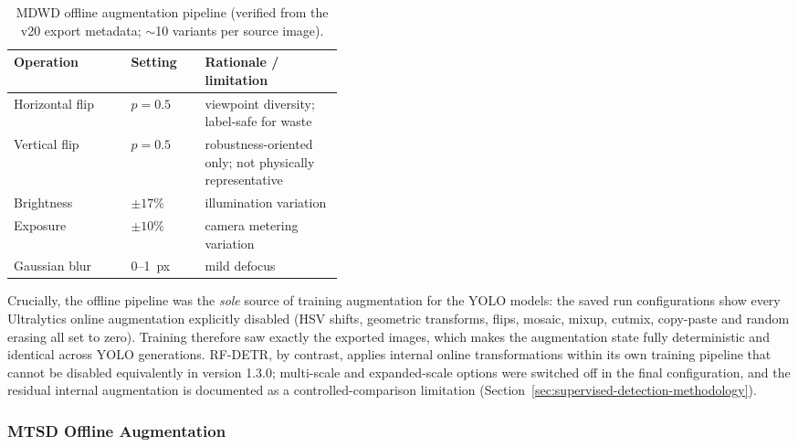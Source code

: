 \begin{table}[htbp]
\centering
\caption{MDWD offline augmentation pipeline (verified from the v20 export metadata; $\sim$10 variants per source image).}
\label{tab:mdwd-aug}
\small
\begin{tabular}{llp{0.42\linewidth}}
\hline
\textbf{Operation} & \textbf{Setting} & \textbf{Rationale / limitation} \\
\hline
Horizontal flip & $p = 0.5$ & viewpoint diversity; label-safe for waste \\
Vertical flip & $p = 0.5$ & robustness-oriented only; not physically representative \\
Brightness & $\pm 17\%$ & illumination variation \\
Exposure & $\pm 10\%$ & camera metering variation \\
Gaussian blur & 0--1~px & mild defocus \\
\hline
\end{tabular}
\end{table}

Crucially, the offline pipeline was the \emph{sole} source of training augmentation for the YOLO models: the saved run configurations show every Ultralytics online augmentation explicitly disabled (HSV shifts, geometric transforms, flips, mosaic, mixup, cutmix, copy-paste and random erasing all set to zero). Training therefore saw exactly the exported images, which makes the augmentation state fully deterministic and identical across YOLO generations. RF-DETR, by contrast, applies internal online transformations within its own training pipeline that cannot be disabled equivalently in version 1.3.0; multi-scale and expanded-scale options were switched off in the final configuration, and the residual internal augmentation is documented as a controlled-comparison limitation (Section~\ref{sec:supervised-detection-methodology}).

\subsubsection{MTSD Offline Augmentation}

